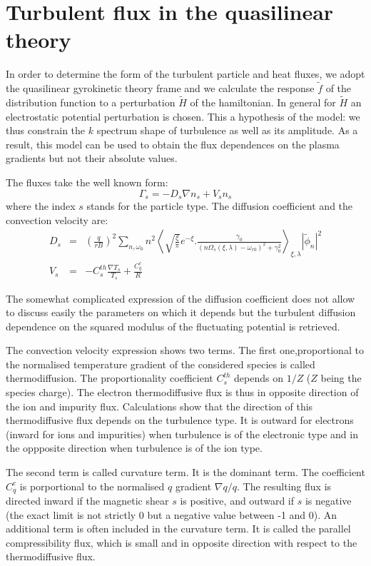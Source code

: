 		\section{Turbulent flux in the quasilinear theory}
		\label{FluxTurbulentsDansLaTheorieQuasiLineaire}

In order to determine the form of the turbulent particle and heat fluxes, we adopt the quasilinear gyrokinetic theory frame and we calculate the response $\tilde{f}$ of the distribution function to a perturbation $\tilde{H}$ of the hamiltonian. In general for $\tilde{H}$ an electrostatic potential perturbation is chosen. This a hypothesis of the model: we thus constrain the $k$ spectrum shape of turbulence as well as its amplitude. As a result, this model can be used to obtain the flux dependences on the plasma gradients but not their absolute values.

The fluxes take the well known form:
\[
	\Gamma_s = -D_s \nabla n_s + V_s n_s
\]
where the index $s$ stands for the particle type. The diffusion coefficient and the convection velocity are:
\begin{eqnarray*}
		D_s  &  =  &  \left( \frac{q}{rB} \right)^2 \sum_{n,\omega_0} n^2 \left< \sqrt{\frac{\xi}{\pi}} e^{-\xi}.\frac{\gamma_0}{\left( n\Omega_s(\xi,\lambda) - \omega_{r0} \right)^2 + \gamma_0^2} \right>_{\xi,\lambda} \left| \tilde{\phi}_n \right|^2		\\
		V_s  &  =  &  - C_s^{th} \frac{\nabla T_s}{T_s} + \frac{C_q^c}{R}
\end{eqnarray*}

The somewhat complicated expression of the diffusion coefficient does not allow to discuss easily the parameters on which it depends but the turbulent diffusion dependence on the squared modulus of the fluctuating potential is retrieved.

The convection velocity expression shows two terms. The first one,proportional to the normalised temperature gradient of the considered species is called thermodiffusion. The proportionality coefficient $C_s^{th}$ depends on $1/Z$ ($Z$ being the species charge). The electron thermodiffusive flux is thus in opposite direction of the ion and impurity flux. Calculations show that the direction of this thermodiffusive flux depends on the turbulence type. It is outward for electrons (inward for ions and impurities) when turbulence is of the electronic type and in the oppposite direction when turbulence is of the ion type.

The second term is called curvature term. It is the dominant term. The coefficient $C_q^c$ is porportional to the normalised $q$ gradient $\nabla q/q$. The resulting flux is directed inward if the magnetic shear $s$ is positive, and outward if $s$ is negative (the exact limit is not strictly 0 but a negative value between -1 and 0). An additional term is often included in the curvature term. It is called the parallel compressibility flux, which is small and in opposite direction with respect to the thermodiffusive flux.

